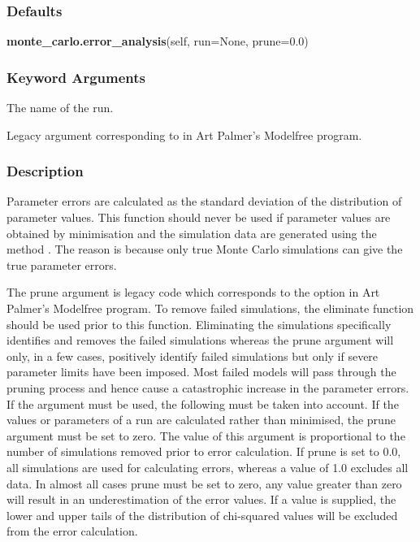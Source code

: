   
 \subsubsection{Defaults} 

 \textsf{\textbf{monte\_carlo.error\_analysis}(self, run=None, prune=0.0)} 

  
 \subsubsection{Keyword Arguments} 

   The name of the run.   

   Legacy argument corresponding to  in Art Palmer's Modelfree program.  

  

  
 \subsubsection{Description} 

 Parameter errors are calculated as the standard deviation of the distribution of parameter values.  This function should never be used if parameter values are obtained by minimisation and the simulation data are generated using the method .  The reason is because only true Monte Carlo simulations can give the true parameter errors. 
  

 The prune argument is legacy code which corresponds to the  option in Art Palmer's Modelfree program.  To remove failed simulations, the eliminate function should be used prior to this function.  Eliminating the simulations specifically identifies and removes the failed simulations whereas the prune argument will only, in a few cases, positively identify failed simulations but only if severe parameter limits have been imposed.  Most failed models will pass through the pruning process and hence cause a catastrophic increase in the parameter errors.  If the argument must be used, the following must be taken into account. If the values or parameters of a run are calculated rather than minimised, the prune argument must be set to zero.  The value of this argument is proportional to the number of simulations removed prior to error calculation.  If prune is set to 0.0, all simulations are used for calculating errors, whereas a value of 1.0 excludes all data.  In almost all cases prune must be set to zero, any value greater than zero will result in an underestimation of the error values.  If a value is supplied, the lower and upper tails of the distribution of chi-squared values will be excluded from the error calculation. 
  


